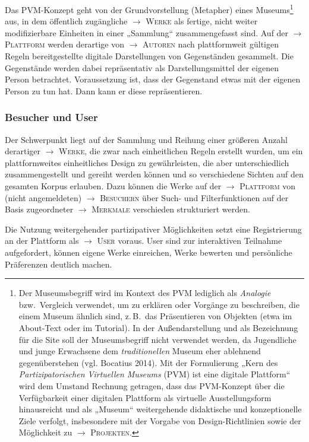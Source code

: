 \documentclass[a4paper,11pt]{article}
\newcommand{\glossar}[1]{{$\to$ \textsc{#1}}}
\begin{document}
Das PVM-Konzept geht von der Grundvorstellung (Metapher) eines
Museums\footnote{Der Museumsbegriff wird im Kontext des PVM lediglich als
  \emph{Analogie} bzw.\ Vergleich verwendet, um zu erklären oder Vorgänge zu
  beschreiben, die einem Museum ähnlich sind, z.\,B.\ das Präsentieren von
  Objekten (etwa im About-Text oder im Tutorial).  In der Außendarstellung und
  als Bezeichnung für die Site soll der Museumsbegriff nicht verwendet werden,
  da Jugendliche und junge Erwachsene dem \emph{traditionellen} Museum eher
  ablehnend gegenüberstehen (vgl. Bocatius 2014).  Mit der Formulierung „Kern
  des \emph{Partizipatorischen Virtuellen Museums} (PVM) ist eine digitale
  {Plattform}“ wird dem Umstand Rechnung getragen, dass das PVM-Konzept über
  die Verfügbarkeit einer digitalen Plattform als virtuelle Ausstellungsform
  hinausreicht und als „Museum“ weitergehende didaktische und konzeptionelle
  Ziele verfolgt, insbesondere mit der Vorgabe von Design-Richtlinien sowie
  der Möglichkeit zu \glossar{Projekten}.} aus, in dem öffentlich zugängliche
\glossar{Werke} als fertige, nicht weiter modifizierbare Einheiten in einer
„Sammlung“ zusammengefasst sind.  Auf der \glossar{Plattform} werden derartige
von \glossar{Autoren} nach plattformweit gültigen Regeln bereitgestellte
digitale Darstellungen von Gegenständen gesammelt. Die Gegenstände werden
dabei repräsentativ als Darstellungsmittel der eigenen Person betrachtet.
Voraussetzung ist, dass der Gegenstand etwas mit der eigenen Person zu tun
hat.  Dann kann er diese repräsentieren.

\subsubsection{Besucher und User}

Der Schwerpunkt liegt auf der Sammlung und Reihung einer größeren Anzahl
derartiger \glossar{Werke}, die zwar nach einheitlichen Regeln erstellt
wurden, um ein plattformweites einheitliches Design zu gewährleisten, die aber
unterschiedlich zusammengestellt und gereiht werden können und so verschiedene
Sichten auf den gesamten Korpus erlauben.  Dazu können die Werke auf der
\glossar{Plattform} von (nicht angemeldeten) \glossar{Besuchern} über Such-
und Filterfunktionen auf der Basis zugeordneter \glossar{Merkmale} verschieden
strukturiert werden.

Die Nutzung weitergehender partizipativer Möglichkeiten setzt eine
Registrierung an der Plattform als \glossar{User} voraus.  User sind zur
interaktiven Teilnahme aufgefordert, können eigene Werke einreichen, Werke
bewerten und persönliche Präferenzen deutlich machen.
\end{document}
